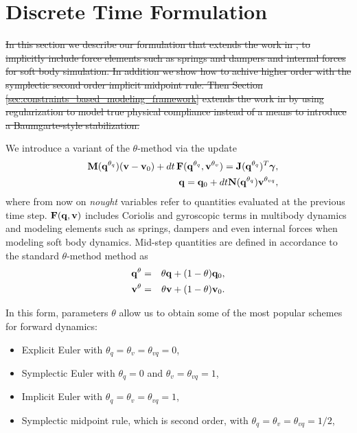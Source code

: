 \section{Discrete Time Formulation}

\sout{In this section we describe our formulation that extends the work in
\cite{bib:anitescu2010}, \cite{bib:todorov2014} to implicitly include force
elements such as springs and dampers and internal forces for soft body
simulation. In addition we show how to achive higher order with the symplectic
second order implicit midpoint rule. Then Section
\ref{sec:constraints_based_modeling_framework} extends the work in
\cite{bib:todorov2014} by using regularization to model true physical compliance
instead of a means to introduce a Baumgarte-style stabilization.}

We introduce a variant of the $\theta\text{-method}$ via the update 
\begin{eqnarray}
	&&\mf{M}(\mf{q}^{\theta_{q}})(\mf{v}-\mf{v}_0) + 
	dt\,\mf{F}(\mf{q}^{\theta_{q}}, \mf{v}^{\theta_v}) = \mf{J}(\mf{q}^{\theta_{q}})^T\mf{\bgamma},
	\label{eq:v_update}\\
	&&\mf{q} = \mf{q}_0 + dt\mf{N}(\mf{q}^{\theta_{q}})\mf{v}^{\theta_{vq}},
	\label{eq:q_update}
\end{eqnarray}
where from now on \textit{nought} variables refer to quantities evaluated at the
previous time step. ${\mathbf{F}}({\mathbf{q}}, {\mathbf{v}})$ includes Coriolis and gyroscopic
terms in multibody dynamics and modeling elements such as springs, dampers and
even internal forces when modeling soft body dynamics. Mid-step quantities are
defined in accordance to the standard $\theta\text{-method}$ method as
\begin{eqnarray}
	{\mathbf{q}}^{\theta} &=& \theta{\mathbf{q}} + (1-\theta){\mathbf{q}}_0,\\
	{\mathbf{v}}^{\theta} &=& \theta{\mathbf{v}} + (1-\theta){\mathbf{v}}_0.
\end{eqnarray}

In this form, parameters $\theta$ allow us to obtain some of the most popular
schemes for forward dynamics:
\begin{itemize}
	\item Explicit Euler with $\theta_q=\theta_{v}=\theta_{vq} = 0$,
	\item Symplectic Euler with $\theta_{q} = 0$ and $\theta_v = \theta_{vq}=1$,
	\item Implicit Euler with $\theta_{q} = \theta_v = \theta_{vq}= 1$,
	\item Symplectic midpoint rule, which is second order, with $\theta_{q} =
	\theta_v = \theta_{vq}= 1/2$,
\end{itemize}


